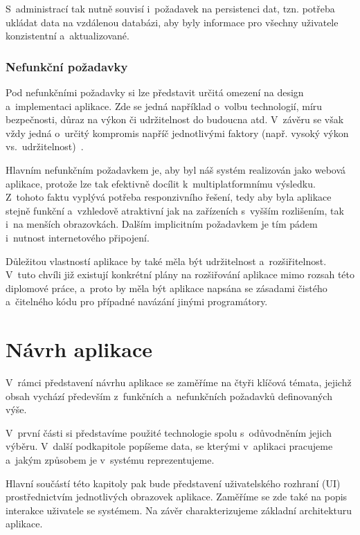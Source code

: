 S~administrací tak nutně souvisí i~požadavek na persistenci dat, tzn. potřeba ukládat data na vzdálenou databázi, aby byly informace pro všechny uživatele konzistentní a~aktualizované.

\hypertarget{nefunkux10dnuxed-poux17eadavky}{%
\subsection{Nefunkční požadavky}\label{nefunkux10dnuxed-poux17eadavky}}

Pod nefunkčními požadavky si lze představit určitá omezení na design a~implementaci aplikace. Zde se jedná například o~volbu technologií, míru bezpečnosti, důraz na výkon či udržitelnost do budoucna atd. V~závěru se však vždy jedná o~určitý kompromis napříč jednotlivými faktory (např. vysoký výkon vs.~udržitelnost)~\parencite{Gorton2006}.

Hlavním nefunkčním požadavkem je, aby byl náš systém realizován jako webová aplikace, protože lze tak efektivně docílit k~multiplatformnímu výsledku. Z~tohoto faktu vyplývá potřeba responzivního řešení, tedy aby byla aplikace stejně funkční a~vzhledově atraktivní jak na zařízeních s~vyšším rozlišením, tak i~na menších obrazovkách. Dalším implicitním požadavkem je tím pádem i~nutnost internetového připojení.

Důležitou vlastností aplikace by také měla být udržitelnost a~rozšiřitelnost. V~tuto chvíli již existují konkrétní plány na rozšiřování aplikace mimo rozsah této diplomové práce, a~proto by měla být aplikace napsána se zásadami čistého a~čitelného kódu pro případné navázání jinými programátory.

\hypertarget{nuxe1vrh-aplikace}{%
\chapter{Návrh aplikace}\label{nuxe1vrh-aplikace}}

V~rámci představení návrhu aplikace se zaměříme na čtyři klíčová témata, jejichž obsah vychází především z~funkčních a~nefunkčních požadavků definovaných výše.

V~první části si představíme použité technologie spolu s~odůvodněním jejich výběru. V~další podkapitole popíšeme data, se kterými v~aplikaci pracujeme a~jakým způsobem je v~systému reprezentujeme.

Hlavní součástí této kapitoly pak bude představení uživatelského rozhraní (UI) prostřednictvím jednotlivých obrazovek aplikace. Zaměříme se zde také na popis interakce uživatele se systémem. Na závěr charakterizujeme základní architekturu aplikace.

